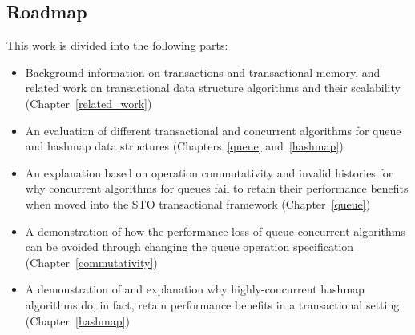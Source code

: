 \subsection{Roadmap}
This work is divided into the following parts: 
\begin{itemize}
    \item Background information on transactions and transactional memory, and related work on transactional data structure algorithms and their scalability (Chapter~\ref{related_work})
    \item An evaluation of different transactional and concurrent algorithms for queue and hashmap data structures (Chapters~\ref{queue} and~\ref{hashmap})
    \item An explanation based on operation commutativity and invalid histories for why concurrent algorithms for queues fail to retain their performance benefits when moved into the STO transactional framework (Chapter~\ref{queue})
    \item A demonstration of how the performance loss of queue concurrent algorithms can be avoided through changing the queue operation specification (Chapter~\ref{commutativity})
    \item A demonstration of and explanation why highly-concurrent hashmap algorithms do, in fact, retain performance benefits in a transactional setting (Chapter~\ref{hashmap})
\end{itemize}

